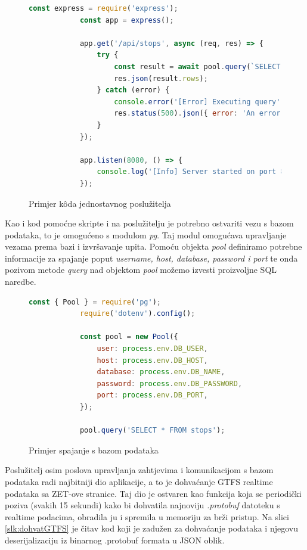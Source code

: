 \documentclass[zavrsnirad]{fer}
\begin{document}
\begin{figure}[H]
	\centering
	\begin{minipage}{0.9\linewidth}
		\begin{lstlisting}[language=JavaScript]
			const express = require('express');
			const app = express();
			
			app.get('/api/stops', async (req, res) => {
				try {
					const result = await pool.query(`SELECT DISTINCT stop_name FROM stops`);
					res.json(result.rows);
				} catch (error) {
					console.error('[Error] Executing query', error);
					res.status(500).json({ error: 'An error occurred' });
				}
			});
			
			app.listen(8080, () => {
				console.log('[Info] Server started on port 8080');
			});
		\end{lstlisting}
	\end{minipage}
	\caption{Primjer k\^oda jednostavnog poslužitelja}
	\label{slk:express}
\end{figure}
\newpage
Kao i kod pomoćne skripte i na poslužitelju je potrebno ostvariti vezu s bazom podataka, to je omogućeno s modulom \textit{pg}. Taj modul omogućava upravljanje vezama prema bazi i izvršavanje upita.
Pomoću objekta \textit{pool} definiramo potrebne informacije za spajanje poput \textit{username, host, database, password i port} te onda pozivom metode \textit{query} nad objektom \textit{pool} možemo izvesti proizvoljne SQL naredbe.

\begin{figure}[H]
	\centering
	\begin{minipage}{0.9\linewidth}
		\begin{lstlisting}[language=JavaScript]
			const { Pool } = require('pg');
			require('dotenv').config();

			const pool = new Pool({
				user: process.env.DB_USER,
				host: process.env.DB_HOST,
				database: process.env.DB_NAME,
				password: process.env.DB_PASSWORD,
				port: process.env.DB_PORT,
			});
			
			pool.query('SELECT * FROM stops');
		\end{lstlisting}
	\end{minipage}
	\caption{Primjer spajanje s bazom podataka}
	\label{slk:baza}
\end{figure}

Poslužitelj osim poslova upravljanja zahtjevima i komunikacijom s bazom podataka radi najbitniji dio aplikacije, a to je dohvaćanje GTFS realtime podataka sa ZET-ove stranice. Taj dio je ostvaren kao funkcija koja se periodički poziva (svakih 15 sekundi) kako bi dohvatila najnoviju \textit{.protobuf} datoteku s realtime podacima, obradila ju i spremila u memoriju za brži pristup. Na slici \ref{slk:dohvatGTFS} je čitav kod koji je zadužen za dohvaćanje podataka i njegovu deserijalizaciju iz binarnog .protobuf formata u JSON oblik.\\
\end{document}
